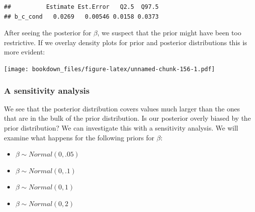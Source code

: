\documentclass[12pt,]{krantz}
\newenvironment{Shaded}{\begin{snugshade}}{\end{snugshade}}
\newcommand{\CommentTok}[1]{\textcolor[rgb]{0.56,0.35,0.01}{\textit{#1}}}
\newcommand{\DataTypeTok}[1]{\textcolor[rgb]{0.13,0.29,0.53}{#1}}
\newcommand{\DecValTok}[1]{\textcolor[rgb]{0.00,0.00,0.81}{#1}}
\newcommand{\FloatTok}[1]{\textcolor[rgb]{0.00,0.00,0.81}{#1}}
\newcommand{\KeywordTok}[1]{\textcolor[rgb]{0.13,0.29,0.53}{\textbf{#1}}}
\newcommand{\NormalTok}[1]{#1}
\newcommand{\OperatorTok}[1]{\textcolor[rgb]{0.81,0.36,0.00}{\textbf{#1}}}
\newcommand{\StringTok}[1]{\textcolor[rgb]{0.31,0.60,0.02}{#1}}
\providecommand{\tightlist}{%
  \setlength{\itemsep}{0pt}\setlength{\parskip}{0pt}}
\theoremstyle{definition}
\theoremstyle{definition}
\theoremstyle{definition}
\theoremstyle{remark}
\begin{document}
\begin{verbatim}
##          Estimate Est.Error   Q2.5  Q97.5
## b_c_cond   0.0269   0.00546 0.0158 0.0373
\end{verbatim}

After seeing the posterior for \(\beta\), we suspect that the prior might have been too restrictive. If we overlay density plots for prior and posterior distributions this is more evident:

\begin{Shaded}
\end{Shaded}

\texttt{[image: bookdown\_files/figure-latex/unnamed-chunk-156-1.pdf]}

\hypertarget{a-sensitivity-analysis}{%
\subsubsection{A sensitivity analysis}\label{a-sensitivity-analysis}}

We see that the posterior distribution covers values much larger than the ones that are in the bulk of the prior distribution. Is our posterior overly biased by the prior distribution? We can investigate this with a sensitivity analysis. We will examine what happens for the following priors for \(\beta\):

\begin{itemize}
\tightlist
\item
  \(\beta \sim Normal(0,.05)\)
\item
  \(\beta \sim Normal(0,.1)\)
\item
  \(\beta \sim Normal(0,1)\)
\item
  \(\beta \sim Normal(0,2)\)
\end{itemize}
\end{document}
